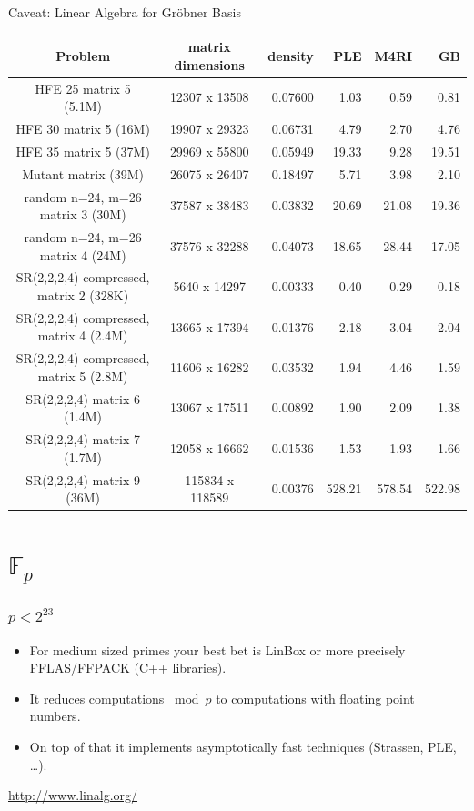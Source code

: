 \documentclass[11pt]{beamer}
\newcommand{\field}[1]{\mathbb{#1}}
\newcommand{\F}{\ensuremath{\field{F}}\xspace}
\begin{document}
\begin{frame}{Caveat: Linear Algebra for Gröbner Basis}
\begin{tiny}
\begin{center}
\begin{tabular}{|c|c|r|r|r|r|}
\hline
Problem  & matrix dimensions &  density &  PLE & M4RI & GB\\
\hline        
HFE 25 matrix 5 (5.1M) & 12307 x 13508 & 0.07600 &  1.03 &  {\color{pink} 0.59} &  0.81\\
HFE 30 matrix 5 (16M)  & 19907 x 29323 & 0.06731 &  4.79 &  {\color{pink} 2.70} &  4.76\\
HFE 35 matrix 5 (37M)  & 29969 x 55800 & 0.05949 & 19.33 &  {\color{pink} 9.28} & 19.51\\
Mutant matrix (39M)    & 26075 x 26407 & 0.18497 &  5.71 &                 3.98 & {\color{pink} 2.10}\\
random n=24, m=26 matrix 3 (30M) & 37587 x 38483 & 0.03832 & 20.69 & 21.08 & {\color{pink} 19.36}\\
random n=24, m=26 matrix 4 (24M) & 37576 x 32288 & 0.04073 & 18.65 & 28.44 & {\color{pink} 17.05}\\
SR(2,2,2,4) compressed, matrix 2 (328K) &  5640 x 14297 & 0.00333 & 0.40 & 0.29 & {\color{pink} 0.18}\\
SR(2,2,2,4) compressed, matrix 4 (2.4M) & 13665 x 17394 & 0.01376 & 2.18 & 3.04 & {\color{pink} 2.04}\\
SR(2,2,2,4) compressed, matrix 5 (2.8M) & 11606 x 16282 & 0.03532 & 1.94 & 4.46 & {\color{pink} 1.59}\\
SR(2,2,2,4) matrix 6 (1.4M) & 13067 x 17511 & 0.00892 & 1.90 & 2.09 & {\color{pink} 1.38}\\
SR(2,2,2,4) matrix 7 (1.7M) & 12058 x 16662 & 0.01536 & {\color{pink} 1.53} & 1.93 & 1.66\\
SR(2,2,2,4) matrix 9 (36M) & 115834 x 118589 & 0.00376 & 528.21 & 578.54 & {\color{pink} 522.98}\\
\hline
\end{tabular}
\end{center}
\end{tiny} 
\end{frame}


\section{\texorpdfstring{$\F_p$}{Fp}}
\begin{frame}
\frametitle{$p<2^{23}$}
\begin{itemize}
 \item For medium sized primes your best bet is LinBox or more precisely FFLAS/FFPACK (C++ libraries).
 \item It reduces computations $\bmod p$ to computations with floating point numbers.
 \item On top of that it implements asymptotically fast techniques (Strassen, PLE, \dots).
\end{itemize}
 
\begin{block}{}
\centering
\url{http://www.linalg.org/} 
\end{block}

\end{frame}
\end{document}

